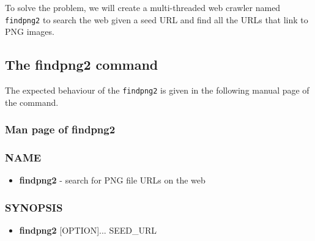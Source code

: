 To solve the problem, we will create a multi-threaded web crawler named \verb+findpng2+ to search the web given a seed URL and find all the URLs that link to PNG images.

\subsection{The findpng2 command}
The expected behaviour of the \verb+findpng2+ is given in the following manual page of the command.
\subsubsection{Man page of findpng2}
\label{sec:findpng2_man}
\subsubsection*{NAME}
\begin{itemize}
	\item[]{\bf findpng2} - search for PNG file URLs on the web
\end{itemize}
\subsubsection*{SYNOPSIS}
\begin{itemize}
	\item[]{\bf findpng2} [OPTION]... SEED\_URL
\end{itemize}
